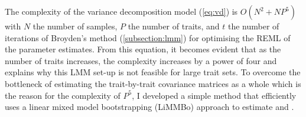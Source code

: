 The complexity of the variance decomposition model (\cref{eq:vd}) is \(O(N^2 + NP^5)\) with \(N\) the number of samples, \(P\) the number of traits, and \(t\) the number of iterations of Broyden's method (\cref{subsection:lmm}) for optimising the REML of the parameter estimates. From this equation, it becomes evident that as the number of traits increases, the complexity increases by a power of four and explains why this LMM set-up is not feasible for large trait sets. To overcome the bottleneck of estimating the trait-by-trait covariance matrices as a whole which is the reason for the complexity of \(P^5\), I developed a simple method that efficiently uses a linear mixed model bootstrapping (LiMMBo) approach to estimate  and .